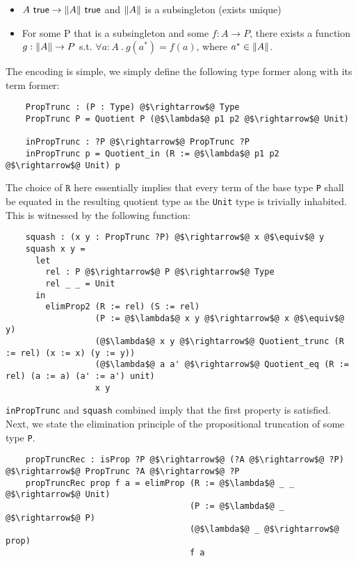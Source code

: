 \documentclass[12pt,twoside,maitrise]{dms}
\theoremstyle{definition}
\numberwithin{equation}{section}
\numberwithin{table}{chapter}
\numberwithin{figure}{chapter}
\DeclarePairedDelimiter{\norm}{\lVert}{\rVert}
\newcommand\kw[1] {\textsf{#1}}
\newcommand\id[1] {\texttt{#1}}
\begin{document}
\begin{itemize}
	\item $A \ \kw{true} \rightarrow \norm{A} \ \kw{true}$ and $\norm{A}$
      is a subsingleton (exists unique)
	\item For some P that is a subsingleton and some $f : A \rightarrow P$, there exists a function $g : \norm{A} \rightarrow P$ s.t. $ \forall a : A \ . \ g(a^*) = f(a)$, where $a^* \in \norm{A}$.
\end{itemize}

The encoding is simple, we simply define the following type former along with its term former:

\begin{verbatim}
    PropTrunc : (P : Type) @$\rightarrow$@ Type
    PropTrunc P = Quotient P (@$\lambda$@ p1 p2 @$\rightarrow$@ Unit)

    inPropTrunc : ?P @$\rightarrow$@ PropTrunc ?P
    inPropTrunc p = Quotient_in (R := @$\lambda$@ p1 p2 @$\rightarrow$@ Unit) p
\end{verbatim}

The choice of $\id{R}$ here essentially implies that every term of the base type
\id{P} shall be equated in the resulting quotient type as the \id{Unit} type is
trivially inhabited. This is witnessed by the following function:

\begin{verbatim}
    squash : (x y : PropTrunc ?P) @$\rightarrow$@ x @$\equiv$@ y
    squash x y =
      let
        rel : P @$\rightarrow$@ P @$\rightarrow$@ Type
        rel _ _ = Unit
      in
        elimProp2 (R := rel) (S := rel)
                  (P := @$\lambda$@ x y @$\rightarrow$@ x @$\equiv$@ y)
                  (@$\lambda$@ x y @$\rightarrow$@ Quotient_trunc (R := rel) (x := x) (y := y))
                  (@$\lambda$@ a a' @$\rightarrow$@ Quotient_eq (R := rel) (a := a) (a' := a') unit)
                  x y
\end{verbatim}

\id{inPropTrunc} and \id{squash} combined imply that the first property is satisfied. Next, we state the elimination principle of the propositional truncation of some type \id{P}.

\begin{verbatim}
    propTruncRec : isProp ?P @$\rightarrow$@ (?A @$\rightarrow$@ ?P) @$\rightarrow$@ PropTrunc ?A @$\rightarrow$@ ?P
    propTruncRec prop f a = elimProp (R := @$\lambda$@ _ _ @$\rightarrow$@ Unit)
                                     (P := @$\lambda$@ _ @$\rightarrow$@ P)
                                     (@$\lambda$@ _ @$\rightarrow$@ prop)
                                     f a
\end{verbatim}
\end{document}
